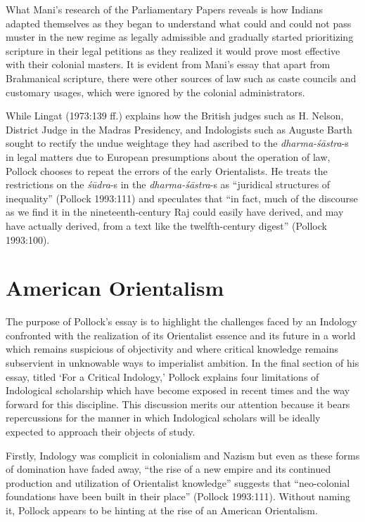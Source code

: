 What Mani’s research of the Parliamentary Papers reveals is how Indians adapted themselves as they began to understand what could and could not pass muster in the new regime as legally admissible and gradually started prioritizing scripture in their legal petitions as they realized it would prove most effective with their colonial masters. It is evident from Mani’s essay that apart from Brahmanical scripture, there were other sources of law such as caste councils and customary usages, which were ignored by the colonial administrators.
\newpage

While Lingat (1973:139 ff.) explains how the British judges such as H. Nelson, District Judge in the Madras Presidency, and Indologists such as Auguste Barth sought to rectify the undue weightage they had ascribed to the {\sl dharma-śāstra}-s in legal matters due to European presumptions about the operation of law, Pollock chooses to repeat the errors of the early Orientalists. He treats the restrictions on the {\sl śūdra}-s in the {\sl dharma-śāstra}-s as “juridical structures of inequality” (Pollock 1993:111) and speculates that “in fact, much of the discourse as we find it in the nineteenth-century Raj could easily have derived, and may have actually derived, from a text like the twelfth-century digest” (Pollock 1993:100).
\medskip

\section*{American Orientalism}

The purpose of Pollock’s essay is to highlight the challenges faced by an Indology confronted with the realization of its Orientalist essence and its future in a world which remains suspicious of objectivity and where critical knowledge remains subservient in unknowable ways to imperialist ambition. In the final section of his essay, titled ‘For a Critical Indology,’ Pollock explains four limitations of Indological scholarship which have become exposed in recent times and the way forward for this discipline. This discussion merits our attention because it bears repercussions for the manner in which Indological scholars will be ideally expected to approach their objects of study.
\vskip 2pt


Firstly, Indology was complicit in colonialism and Nazism but even as these forms of domination have faded away, “the rise of a new empire and its continued production and utilization of Orientalist knowledge” suggests that “neo-colonial foundations have been built in their place” (Pollock 1993:111). Without naming it, Pollock appears to be hinting at the rise of an American Orientalism. 
\vskip 2pt

